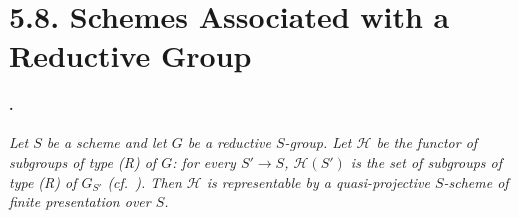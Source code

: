 \section*{5.8. Schemes Associated with a Reductive Group}

\paragraph{.}
\textit{Let \(S\) be a scheme and let \(G\) be a reductive
\(S\)-group. Let \(\mathcal H\) be the functor of subgroups of type
\textup{(R)} of \(G\): for every \(S'\to S\),
\(\mathcal H(S')\) is the set of subgroups of type \textup{(R)} of
\(G_{S'}\) \textup{(cf.\ )}. Then \(\mathcal H\) is
representable by a quasi-projective \(S\)-scheme of finite
presentation over \(S\).}

